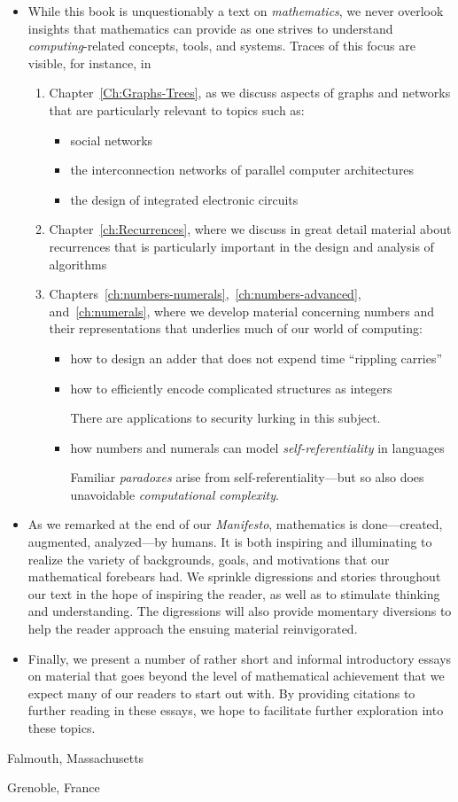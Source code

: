 \begin{itemize}
\item
While this book is unquestionably a text on {\em mathematics}, we
never overlook insights that mathematics can provide as one strives to
understand {\em computing}-related concepts, tools, and systems.
Traces of this focus are visible, for instance, in
  \begin{enumerate}
  \item
Chapter~\ref{Ch:Graphs-Trees}, as we discuss aspects of graphs and
networks that are particularly relevant to topics such as:
     \begin{itemize}
     \item
social networks
     \item
the interconnection networks of parallel computer architectures
     \item
the design of integrated electronic circuits
     \end{itemize}
  \item
Chapter~\ref{ch:Recurrences}, where we discuss in great detail
material about recurrences that is particularly important in the
design and analysis of algorithms
  \item
Chapters~\ref{ch:numbers-numerals},~\ref{ch:numbers-advanced},
and~\ref{ch:numerals}, where we develop material concerning numbers
and their representations that underlies much of our world of
computing:
     \begin{itemize}
     \item
how to design an adder that does not expend time ``rippling carries''
     \item
how to efficiently encode complicated structures as integers

There are applications to security lurking in this subject.
     \item
how numbers and numerals can model {\em self-referentiality} in
languages

Familiar {\it paradoxes} arise from self-referentiality---but so also
does unavoidable {\em computational complexity}.
     \end{itemize}
  \end{enumerate}
\item
As we remarked at the end of our {\it Manifesto}, mathematics is
done---created, augmented, analyzed---by humans.  It is both inspiring
and illuminating to realize the variety of backgrounds, goals, and
motivations that our mathematical forebears had.  We sprinkle
digressions and stories throughout our text in the hope of inspiring
the reader, as well as to stimulate thinking and understanding.  The
digressions will also provide momentary diversions to help the reader
approach the ensuing material reinvigorated.

\item
Finally, we present a number of rather short and informal introductory
essays on material that goes beyond the level of mathematical
achievement that we expect many of our readers to start out with.  By
providing citations to further reading in these essays, we hope to
facilitate further exploration into these topics.
\end{itemize}

\bigskip

\hfill Falmouth, Massachusetts

\hfill Grenoble, France



